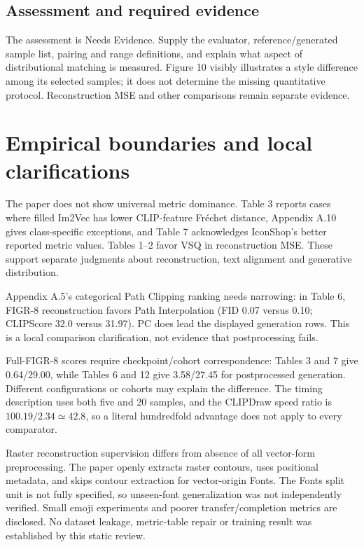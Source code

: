 \documentclass[10pt]{article}
\begin{document}
\subsection*{Assessment and required evidence}
The assessment is Needs Evidence. Supply the evaluator, reference/generated sample list, pairing and range definitions, and explain what aspect of distributional matching is measured. Figure 10 visibly illustrates a style difference among its selected samples; it does not determine the missing quantitative protocol. Reconstruction MSE and other comparisons remain separate evidence.\par
\section*{Empirical boundaries and local clarifications}
The paper does not show universal metric dominance. Table 3 reports cases where filled Im2Vec has lower CLIP-feature Fréchet distance, Appendix A.10 gives class-specific exceptions, and Table 7 acknowledges IconShop’s better reported metric values. Tables 1–2 favor VSQ in reconstruction MSE. These support separate judgments about reconstruction, text alignment and generative distribution.\par
Appendix A.5’s categorical Path Clipping ranking needs narrowing: in Table 6, FIGR-8 reconstruction favors Path Interpolation (FID 0.07 versus 0.10; CLIPScore 32.0 versus 31.97). PC does lead the displayed generation rows. This is a local comparison clarification, not evidence that postprocessing fails.\par
Full-FIGR-8 scores require checkpoint/cohort correspondence: Tables 3 and 7 give 0.64/29.00, while Tables 6 and 12 give 3.58/27.45 for postprocessed generation. Different configurations or cohorts may explain the difference. The timing description uses both five and 20 samples, and the CLIPDraw speed ratio is \(100.19/2.34\simeq42.8\), so a literal hundredfold advantage does not apply to every comparator.\par
Raster reconstruction supervision differs from absence of all vector-form preprocessing. The paper openly extracts raster contours, uses positional metadata, and skips contour extraction for vector-origin Fonts. The Fonts split unit is not fully specified, so unseen-font generalization was not independently verified. Small emoji experiments and poorer transfer/completion metrics are disclosed. No dataset leakage, metric-table repair or training result was established by this static review.\par
\end{document}
